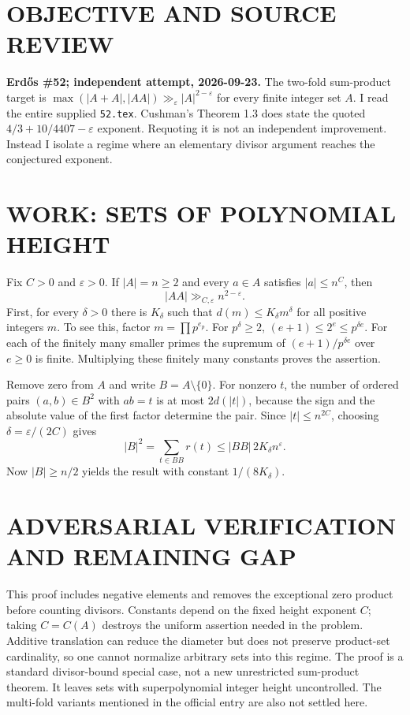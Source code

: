 \section{OBJECTIVE AND SOURCE REVIEW}
\textbf{Erd\H{o}s \#52; independent attempt, 2026-09-23.}
The two-fold sum-product target is $\max(|A+A|,|AA|)\gg_\varepsilon |A|^{2-\varepsilon}$ for every finite integer set $A$. I read the entire supplied \texttt{52.tex}. Cushman's Theorem 1.3 does state the quoted $4/3+10/4407-\varepsilon$ exponent. Requoting it is not an independent improvement. Instead I isolate a regime where an elementary divisor argument reaches the conjectured exponent.

\section{WORK: SETS OF POLYNOMIAL HEIGHT}
Fix $C>0$ and $\varepsilon>0$. If $|A|=n\ge2$ and every $a\in A$ satisfies $|a|\le n^C$, then
\[
|AA|\gg_{C,\varepsilon}n^{2-\varepsilon}.
\]
First, for every $\delta>0$ there is $K_\delta$ such that $d(m)\le K_\delta m^\delta$ for all positive integers $m$. To see this, factor $m=\prod p^{e_p}$. For $p^\delta\ge2$,
$(e+1)\le2^e\le p^{\delta e}$. For each of the finitely many smaller primes the supremum of $(e+1)/p^{\delta e}$ over $e\ge0$ is finite. Multiplying these finitely many constants proves the assertion.

Remove zero from $A$ and write $B=A\setminus\{0\}$. For nonzero $t$, the number of ordered pairs $(a,b)\in B^2$ with $ab=t$ is at most $2d(|t|)$, because the sign and the absolute value of the first factor determine the pair. Since $|t|\le n^{2C}$, choosing $\delta=\varepsilon/(2C)$ gives
\[
|B|^2=\sum_{t\in BB}r(t)\le |BB|\,2K_\delta n^\varepsilon.
\]
Now $|B|\ge n/2$ yields the result with constant $1/(8K_\delta)$.

\section{ADVERSARIAL VERIFICATION AND REMAINING GAP}
This proof includes negative elements and removes the exceptional zero product before counting divisors. Constants depend on the fixed height exponent $C$; taking $C=C(A)$ destroys the uniform assertion needed in the problem. Additive translation can reduce the diameter but does not preserve product-set cardinality, so one cannot normalize arbitrary sets into this regime. The proof is a standard divisor-bound special case, not a new unrestricted sum-product theorem. It leaves sets with superpolynomial integer height uncontrolled. The multi-fold variants mentioned in the official entry are also not settled here.

